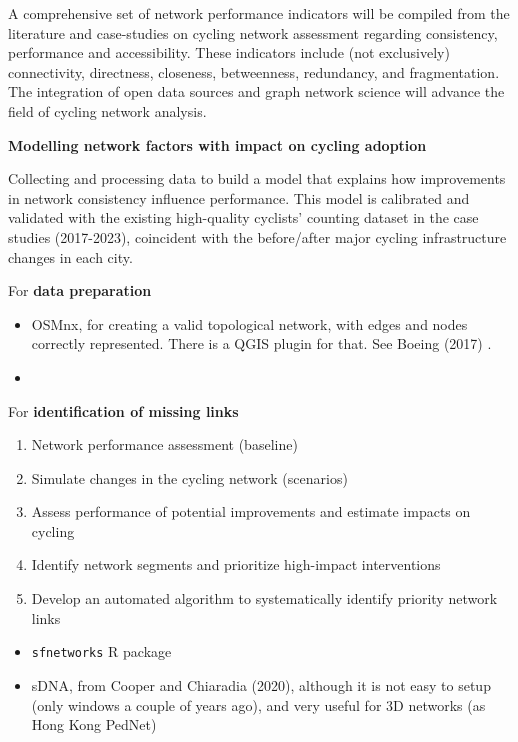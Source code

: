 \documentclass[
  sn-nature,
]{sn-jnl}
\providecommand{\tightlist}{%
  \setlength{\itemsep}{0pt}\setlength{\parskip}{0pt}}
\begin{document}
A comprehensive set of network performance indicators will be compiled
from the literature and case-studies on cycling network assessment
regarding consistency, performance and accessibility. These indicators
include (not exclusively) connectivity, directness, closeness,
betweenness, redundancy, and fragmentation. The integration of open data
sources and graph network science will advance the field of cycling
network analysis.

\textbf{Modelling network factors with impact on cycling adoption}

Collecting and processing data to build a model that explains how
improvements in network consistency influence performance. This model is
calibrated and validated with the existing high-quality cyclists'
counting dataset in the case studies (2017-2023), coincident with the
before/after major cycling infrastructure changes in each city.

For \textbf{data preparation}

\begin{itemize}
\item
  OSMnx, for creating a valid topological network, with edges and nodes
  correctly represented. There is a QGIS plugin for that. See Boeing
  (2017) .
\item
\end{itemize}

For \textbf{identification of missing links}

\begin{enumerate}
\def\labelenumi{\arabic{enumi}.}
\tightlist
\item
  Network performance assessment (baseline)
\item
  Simulate changes in the cycling network (scenarios)
\item
  Assess performance of potential improvements and estimate impacts on
  cycling
\item
  Identify network segments and prioritize high-impact interventions
\item
  Develop an automated algorithm to systematically identify priority
  network links
\end{enumerate}

\begin{itemize}
\item
  \texttt{sfnetworks} R package
\item
  sDNA, from Cooper and Chiaradia (2020), although it is not easy to
  setup (only windows a couple of years ago), and very useful for 3D
  networks (as Hong Kong PedNet)
\end{itemize}
\end{document}
